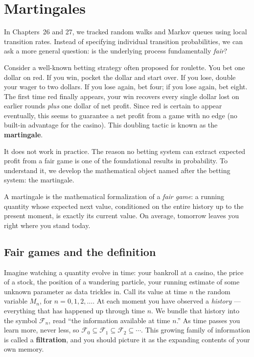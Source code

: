 \chapter{Martingales}

In Chapters~26 and 27, we tracked random walks and Markov queues using local transition rates. Instead of specifying individual transition probabilities, we can ask a more general question: is the underlying process fundamentally \emph{fair}?

Consider a well-known betting strategy often proposed for roulette. You bet one dollar on red. If you win, pocket the dollar and start over. If you lose, double your wager to two dollars. If you lose again, bet four; if you lose again, bet eight. The first time red finally appears, your win recovers every single dollar lost on earlier rounds \emph{plus} one dollar of net profit. Since red is certain to appear eventually, this seems to guarantee a net profit from a game with no edge (no built-in advantage for the casino). This doubling tactic is known as the \textbf{martingale}.

It does not work in practice. The reason no betting system can extract expected profit from a fair game is one of the foundational results in probability. To understand it, we develop the mathematical object named after the betting system: the martingale.

A martingale is the mathematical formalization of a \emph{fair game}: a running quantity whose expected next value, conditioned on the entire history up to the present moment, is exactly its current value. On average, tomorrow leaves you right where you stand today.

\chapterline

\section{Fair games and the definition}
\label{ch28:definition}

Imagine watching a quantity evolve in time: your bankroll at a casino, the price of a stock, the
position of a wandering particle, your running estimate of some unknown parameter as data trickles in.
Call its value at time $n$ the random variable $M_n$, for $n = 0, 1, 2, \dots$. At each moment you
have observed a \emph{history} --- everything that has happened up through time $n$. We bundle that
history into the symbol $\mathcal{F}_n$, read ``the information available at time $n$.'' As time
passes you learn more, never less, so $\mathcal{F}_0 \subseteq \mathcal{F}_1 \subseteq \mathcal{F}_2
\subseteq \cdots$. This growing family of information is called a \textbf{filtration}, and you should
picture it as the expanding contents of your own memory.

